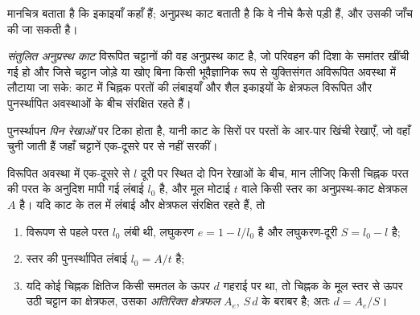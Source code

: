 मानचित्र बताता है कि इकाइयाँ कहाँ हैं; अनुप्रस्थ काट बताती है कि वे नीचे कैसे पड़ी हैं, और उसकी
जाँच की जा सकती है।

\begin{definition}[संतुलित अनुप्रस्थ काट]\label{def:b2:alpine-orogen:balanced}
\emph{संतुलित अनुप्रस्थ काट} विरूपित चट्टानों की वह अनुप्रस्थ काट है,
जो परिवहन की दिशा के समांतर खींची गई हो और जिसे चट्टान जोड़े या खोए बिना
किसी भूवैज्ञानिक रूप से युक्तिसंगत अविरूपित अवस्था में लौटाया जा सके: काट में चिह्नक परतों की लंबाइयाँ
और शैल इकाइयों के क्षेत्रफल विरूपित और पुनर्स्थापित
अवस्थाओं के बीच संरक्षित रहते हैं।
\end{definition}

पुनर्स्थापन \emph{पिन रेखाओं} पर टिका होता है, यानी काट के सिरों पर परतों के आर-पार खिंची रेखाएँ,
जो वहाँ चुनी जाती हैं जहाँ चट्टानें एक-दूसरे पर से नहीं सरकीं।

\begin{proposition}[रेखा-लंबाई और क्षेत्रफल संतुलन]\label{prop:b2:alpine-orogen:balance}
विरूपित अवस्था में एक-दूसरे से $l$ दूरी पर स्थित दो पिन रेखाओं के बीच, मान लीजिए किसी चिह्नक परत की
परत के अनुदिश मापी गई लंबाई $l_0$ है, और मूल मोटाई $t$ वाले किसी स्तर का
अनुप्रस्थ-काट क्षेत्रफल $A$ है। यदि काट के तल में लंबाई और क्षेत्रफल संरक्षित रहते हैं, तो
\begin{enumerate}
\item विरूपण से पहले परत $l_0$ लंबी थी, लघुकरण
$e = 1 - l/l_0$ है और लघुकरण-दूरी $S = l_0 - l$ है;
\item स्तर की पुनर्स्थापित लंबाई $l_0 = A/t$ है;
\item यदि कोई चिह्नक क्षितिज किसी समतल  के ऊपर $d$ गहराई पर था, तो चिह्नक के मूल स्तर से
ऊपर उठी चट्टान का क्षेत्रफल, उसका \emph{अतिरिक्त क्षेत्रफल} $A_e$, $S\,d$ के बराबर है;
अतः $d = A_e/S$।
\end{enumerate}
\end{proposition}

